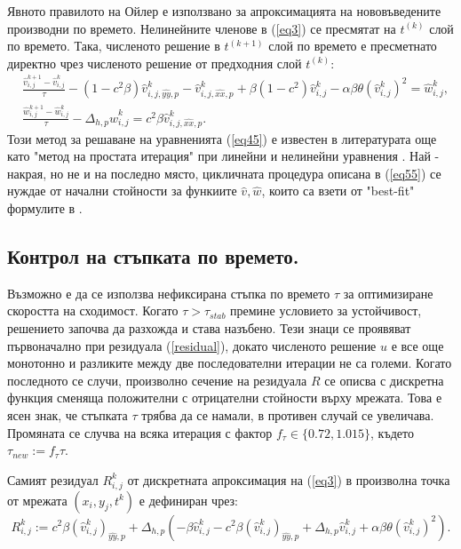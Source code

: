 \documentclass{article}
\newcommand{\rf}[1]{(\ref{#1})}
\begin{document}
\par
Явното правилото на Ойлер е използвано за апроксимацията на нововъведените производни по времето. Нелинейните членове в \rf{eq3} се пресмятат на $t^{(k)}$ слой по времето. Така, численото решение в $t^{(k+1)}$ слой по времето е пресметнато директно чрез численото решение от предходния слой $t^{(k)}$:
\begin{equation}\label{eq55}
\begin{split}
&\frac {\widehat{v}_{i,j}^{k+1}-\widehat{v}_{i,j}^{k}}{\tau}- (1-c^2 \beta) \widehat{v}_{i,j,{\widehat{yy},p}}^{k} - \widehat{v}_{i,j,{\widehat{xx},p}}^{k} + \beta (1-c^2 ) \widehat{v}_{i,j}^{k} - \alpha \beta \theta (\widehat{v}_{i,j}^{k})^2 = \widehat{w}_{i,j}^{k}, \\
&\frac  {\widehat{w}_{i,j}^{k+1} -\widehat{w}_{i,j}^{k}} {\tau} - \Delta_{h,p} \widehat{w}_{i,j}^{k} =  c^2 \beta \widehat{v}_{i,j,{\widehat{xx},p}}^{k}.
\end{split}
\end{equation}
Този метод за решаване на уравненията \rf{eq45} е известен в литературата още като "метод на простата итерация" при линейни и нелинейни уравнения \cite{sam}. Най - накрая, но не и на последно място,  цикличната процедура описана в \rf{eq55} се нуждае от начални стойности за функиите $\widehat{v},\widehat{w}$, които са взети от "best-fit" формулите в \cite{Ch2011}.

\subsection{Контрол на стъпката по времето.}
Възможно е да се използва нефиксирана стъпка по времето $\tau$ за оптимизиране скоростта на сходимост. Когато $\tau > \tau_{stab}$ премине условието за устойчивост, решението започва да разхожда и става назъбено. Тези знаци се проявяват първоначално при резидуала \rf{residual}, докато численото решение $u$ е все още монотонно и разликите между две последователни итерации не са големи. Когато последното се случи, произволно сечение на резидуала $R$ се описва с дискретна функция сменяща положителни с отрицателни стойности върху мрежата. Това е ясен знак, че стъпката $\tau$ трябва да се намали, в противен случай се увеличава. Промяната се случва на всяка итерация с фактор $f_{\tau} \in \{0.72, 1.015\}$, където $\tau_{new} := f_{\tau}\tau$.

Самият резидуал $R^k_{i,j}$ от дискретната апроксимация на \rf{eq3} в произволна точка от мрежата $(x_i,y_j,t^k)$ е дефиниран чрез:
\begin{equation}\label{residual}
R_{i,j}^k := 
c^2\beta (\widehat{v}^k_{i,j})_{\widehat{yy},p} + \Delta_{h,p}(-\beta \widehat{v}^k_{i,j} - c^2\beta (\widehat{v}^k_{i,j})_{\widehat{yy},p} + \Delta_{h,p} \widehat{v}^k_{i,j} 
+ \alpha \beta \theta (\widehat{v}^k_{i,j})^2  ).
\end{equation}
 
\end{document}
